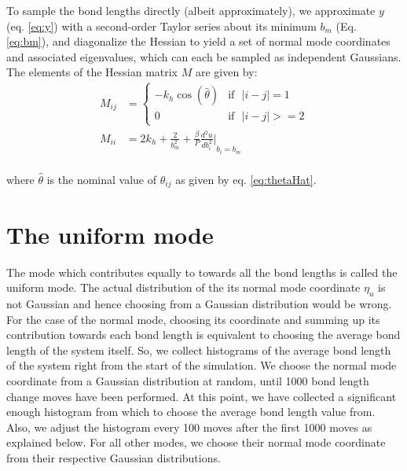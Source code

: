 \label{Appendix B}
    To sample the bond lengths directly (albeit approximately), we approximate $y$ (eq. \eqref{eq:y}) with a second-order Taylor series about its minimum $b_m$ (Eq. \eqref{eq:bm}), and diagonalize the Hessian to yield a set of normal mode coordinates and associated eigenvalues, which can each be sampled as independent Gaussians. The elements of the Hessian matrix $M$ are given by:
    \begin{equation}
        \begin{aligned}
            M_{ij} &= \begin{cases}
            - k_{h}  \cos (\hat \theta) & \text{if} \: \: \: | i - j | = 1\\
            0 & \text{if} \: \: \: | i - j | >= 2
            \end{cases}\\
            M_{ii} &= 2  k_{h} + \frac{2}{b_{m}^2} + \frac{\beta}{P}  {\frac{d^2 u}{d b_i^2} \Bigg|}_{b_i = b_{m}}\\
        \end{aligned}
    \end{equation}

    where $\hat \theta$ is the nominal value of $\theta_{ij}$ as given by eq. \eqref{eq:thetaHat}.

    \section{The uniform mode}
        The mode which contributes equally to towards all the bond lengths is called the uniform mode. The actual distribution of the its normal mode coordinate $\eta_u$ is not Gaussian and hence choosing from a Gaussian distribution would be wrong. For the case of the normal mode, choosing its coordinate and summing up its contribution towards each bond length is equivalent to choosing the average bond length of the system itself. So, we collect histograms of the average bond length of the system right from the start of the simulation. We choose the normal mode coordinate from a Gaussian distribution at random, until 1000 bond length change moves have been performed. At this point, we have collected a significant enough histogram from which to choose the average bond length value from. Also, we adjust the histogram every 100 moves after the first 1000 moves as explained below. For all other modes, we choose their normal mode coordinate from their respective Gaussian distributions.

